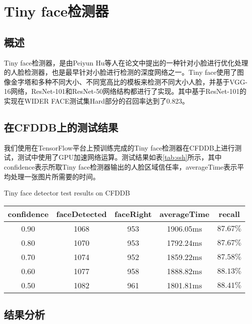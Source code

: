 \section{Tiny face检测器}

\subsection{概述}

Tiny face检测器，是由Peiyun Hu等人在论文\parencite{hu2017finding}中提出的一种针对小脸进行优化处理的人脸检测器，也是最早针对小脸进行检测的深度网络之一。Tiny face使用了图像金字塔和多种不同大小、不同宽高比的模板来检测不同大小人脸，并基于VGG-16网络\cite{simonyan2014very}，ResNet-101和ResNet-50网络\cite{he2016deep}结构都进行了实现。其中基于ResNet-101的实现在WIDER FACE测试集Hard部分的召回率达到了0.823\cite{hu2017finding}。

\subsection{在CFDDB上的测试结果}
\label{chap2:tinyresult}

我们使用在TensorFlow平台上预训练完成的Tiny face检测器在CFDDB上进行测试，测试中使用了GPU加速网络运算。测试结果如表\ref{tab:ssh}所示，其中confidence表示所取Tiny face检测器输出的人脸区域信任率，averageTime表示平均处理一张图片所需要的时间。

\begin{table}[!hpb]
	\centering
	{Tiny face detector test results on CFDDB}
	\label{tab:tiny}
	\begin{tabular}{ cccc | c }
		\hline
		confidence & faceDetected & faceRight & averageTime & recall\\
		\hline
		0.90 & 1068 & 953 & 1906.05ms & $87.67\%$\\
		0.80 & 1070 & 953 & 1792.24ms & $87.67\%$\\
		0.70 & 1074 & 952 & 1859.22ms & $87.58\%$\\
		0.60 & 1077 & 958 & 1888.82ms & $88.13\%$\\
		0.50 & 1082 & 961 & 1801.81ms & $88.41\%$\\
		\hline
	\end{tabular}
\end{table}

\subsection{结果分析}

